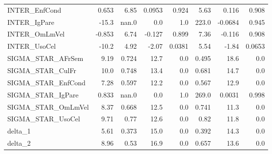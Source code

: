 \begin{tabular}{lrrrrrrr}
INTER\_EnfCond      &   0.653 &     6.85 &  0.0953 &    0.924 &          5.63 &        0.116 &         0.908 \\
INTER\_IgPare       &   -15.3 &    nan.0 &     0.0 &      1.0 &         223.0 &      -0.0684 &         0.945 \\
INTER\_OmLmVel      &  -0.853 &     6.74 &  -0.127 &    0.899 &          7.36 &       -0.116 &         0.908 \\
INTER\_UsoCel       &   -10.2 &     4.92 &   -2.07 &   0.0381 &          5.54 &        -1.84 &        0.0653 \\
SIGMA\_STAR\_AFrSem  &    9.19 &    0.724 &    12.7 &      0.0 &         0.495 &         18.6 &           0.0 \\
SIGMA\_STAR\_CulFr   &    10.0 &    0.748 &    13.4 &      0.0 &         0.681 &         14.7 &           0.0 \\
SIGMA\_STAR\_EnfCond &    7.28 &    0.597 &    12.2 &      0.0 &         0.567 &         12.9 &           0.0 \\
SIGMA\_STAR\_IgPare  &   0.833 &    nan.0 &     0.0 &      1.0 &         269.0 &       0.0031 &         0.998 \\
SIGMA\_STAR\_OmLmVel &    8.37 &    0.668 &    12.5 &      0.0 &         0.741 &         11.3 &           0.0 \\
SIGMA\_STAR\_UsoCel  &    9.71 &     0.77 &    12.6 &      0.0 &          0.82 &         11.8 &           0.0 \\
delta\_1            &    5.61 &    0.373 &    15.0 &      0.0 &         0.392 &         14.3 &           0.0 \\
delta\_2            &    8.96 &     0.53 &    16.9 &      0.0 &         0.657 &         13.6 &           0.0 \\
\bottomrule
\end{tabular}

